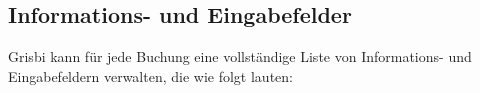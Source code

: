 \subsection{Informations- und Eingabefelder\label{transactions-list-fields}}

Grisbi kann für jede Buchung eine vollständige Liste von Informations- und Eingabefeldern verwalten, die wie folgt lauten:

